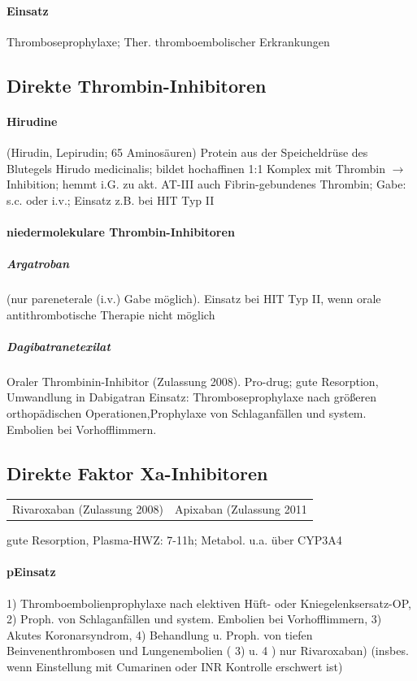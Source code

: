 \documentclass[10pt,a4paper]{report}
\begin{document}
\paragraph{Einsatz} %
\label{par:einsatz}
Thromboseprophylaxe; Ther. thromboembolischer Erkrankungen
\subsection{Direkte Thrombin-Inhibitoren} %
\label{ssec:direkte_thrombin_inhibitoren}
\paragraph{Hirudine} %
\label{par:hirudine}
(Hirudin,  Lepirudin;  65 Aminosäuren) Protein aus der Speicheldrüse des Blutegels Hirudo medicinalis; bildet hochaffinen 1:1 Komplex mit Thrombin $\rightarrow$ Inhibition; hemmt i.G. zu akt. AT-III 	auch Fibrin-gebundenes Thrombin; Gabe: s.c. oder i.v.; Einsatz z.B. bei HIT Typ II
\paragraph{niedermolekulare Thrombin-Inhibitoren} %
\label{par:niedermolekulare_thrombin_inhibitoren}
\subparagraph{Argatroban} %
\label{subp:argatroban}
(nur pareneterale (i.v.) Gabe möglich). Einsatz bei HIT Typ II, wenn orale antithrombotische Therapie nicht möglich
\subparagraph{Dagibatranetexilat} %
\label{subp:dagibatranetexilat}
Oraler Thrombinin-Inhibitor (Zulassung 2008). Pro-drug; gute Resorption, Umwandlung in Dabigatran Einsatz:  Thromboseprophylaxe nach größeren orthopädischen Operationen,Prophylaxe von Schlaganfällen und system. Embolien bei Vorhofflimmern.
\subsection{Direkte Faktor Xa-Inhibitoren} %
\label{ssub:direkte_faktor_xa_inhib}
\begin{tabularx}{\textwidth}{XX}
Rivaroxaban (Zulassung 2008)&Apixaban (Zulassung 2011\\
\end{tabularx}
gute Resorption, Plasma-HWZ: 7-11h; Metabol. u.a. über CYP3A4
\paragraph{pEinsatz} %
\label{par:paragraph_name}
1) Thromboembolienprophylaxe nach elektiven Hüft- oder Kniegelenksersatz-OP,  2) Proph. von Schlaganfällen und system. Embolien bei Vorhofflimmern, 3) Akutes Koronarsyndrom, 4) Behandlung u. Proph. von tiefen Beinvenenthrombosen und Lungenembolien (  3) u. 4 ) nur Rivaroxaban) (insbes. wenn Einstellung mit Cumarinen oder INR Kontrolle erschwert ist)
\end{document}
